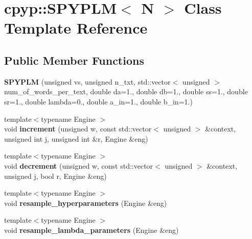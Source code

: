 \hypertarget{classcpyp_1_1_s_p_y_p_l_m}{}\section{cpyp\+:\+:S\+P\+Y\+P\+LM$<$ N $>$ Class Template Reference}
\label{classcpyp_1_1_s_p_y_p_l_m}
\subsection*{Public Member Functions}
\begin{DoxyCompactItemize}
\item 
\mbox{\label{classcpyp_1_1_s_p_y_p_l_m_a33f27e864901666766ab1355314aa9e2}} 
{\bfseries S\+P\+Y\+P\+LM} (unsigned vs, unsigned n\+\_\+txt, std\+::vector$<$ unsigned $>$ num\+\_\+of\+\_\+words\+\_\+per\+\_\+text, double da=1., double db=1., double ss=1., double sr=1., double lambda=0., double a\+\_\+in=1., double b\+\_\+in=1.)
\item 
\mbox{\label{classcpyp_1_1_s_p_y_p_l_m_a411e0a1221c00b3c68bcc6e577057932}} 
{\footnotesize template$<$typename Engine $>$ }\\void {\bfseries increment} (unsigned w, const std\+::vector$<$ unsigned $>$ \&context, unsigned int j, unsigned int \&r, Engine \&eng)
\item 
\mbox{\label{classcpyp_1_1_s_p_y_p_l_m_ab0c6563b5c5c36e4627f1d50bc796550}} 
{\footnotesize template$<$typename Engine $>$ }\\void {\bfseries decrement} (unsigned w, const std\+::vector$<$ unsigned $>$ \&context, unsigned j, bool r, Engine \&eng)
\item 
\mbox{\label{classcpyp_1_1_s_p_y_p_l_m_a06e8add5ae77abc876e47c57027c47e2}} 
{\footnotesize template$<$typename Engine $>$ }\\void {\bfseries resample\+\_\+hyperparameters} (Engine \&eng)
\item 
\mbox{\label{classcpyp_1_1_s_p_y_p_l_m_a89d75da65191519bb0be78bea318eb3e}} 
{\footnotesize template$<$typename Engine $>$ }\\void {\bfseries resample\+\_\+lambda\+\_\+parameters} (Engine \&eng)

\end{DoxyCompactItemize}
